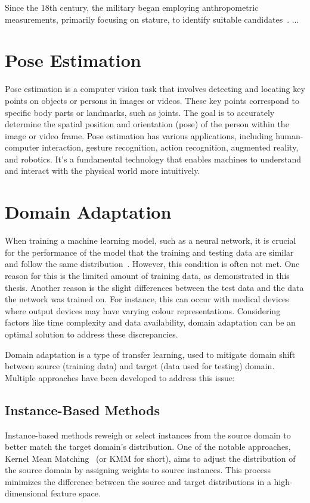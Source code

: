 Since the 18th century, the military began employing anthropometric measurements, primarily focusing on stature, to identify suitable candidates~\cite{anthrohistory}.
...
\section{Pose Estimation}
Pose estimation is a computer vision task that involves detecting and locating key points on objects or persons in images or videos. These key points correspond to specific body parts or landmarks, such as joints. The goal is to accurately determine the spatial position and orientation (pose) of the person within the image or video frame. Pose estimation has various applications, including human-computer interaction, gesture recognition, action recognition, augmented reality, and robotics. It's a fundamental technology that enables machines to understand and interact with the physical world more intuitively.

\section{Domain Adaptation}
When training a machine learning model, such as a neural network, it is crucial for the performance of the model that the training and testing data are similar and follow the same distribution~\cite{domainAdaptation}. However, this condition is often not met. One reason for this is the limited amount of training data, as demonstrated in this thesis. Another reason is the slight differences between the test data and the data the network was trained on. For instance, this can occur with medical devices where output devices may have varying colour representations. Considering factors like time complexity and data availability, domain adaptation can be an optimal solution to address these discrepancies.

Domain adaptation is a type of transfer learning, used to mitigate domain shift between source (training data) and target (data used for testing) domain. Multiple approaches have been developed to address this issue:

\subsection{Instance-Based Methods}
 Instance-based methods reweigh or select instances from the source domain to better match the target domain's distribution. One of the notable approaches, Kernel Mean Matching~\cite{instanceMethod} (or KMM for short),  aims to adjust the distribution of the source domain by assigning weights to source instances. This process minimizes the difference between the  source and target distributions in a high-dimensional feature space.
 
